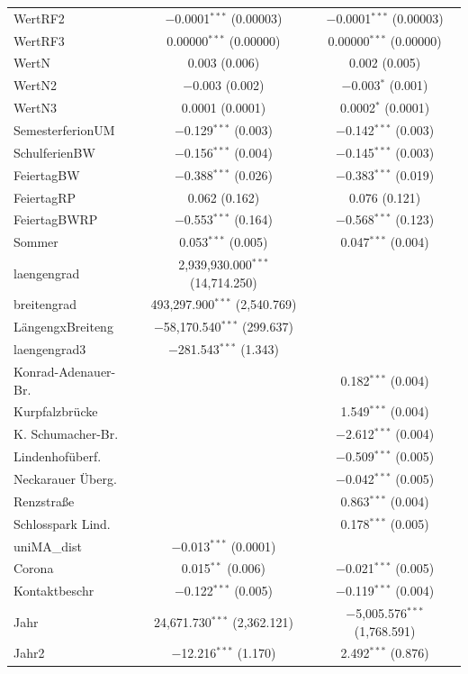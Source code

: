 \documentclass[a4paper,12pt]{thesis}
\begin{document}
\begin{longtable}{@{\extracolsep{-5pt}}lcc}
		WertRF2 & $-$0.0001$^{***}$ (0.00003) & $-$0.0001$^{***}$ (0.00003) \\ 
		WertRF3 & 0.00000$^{***}$ (0.00000) & 0.00000$^{***}$ (0.00000) \\ 
		WertN & 0.003 (0.006) & 0.002 (0.005) \\ 
		WertN2 & $-$0.003 (0.002) & $-$0.003$^{*}$ (0.001) \\ 
		WertN3 & 0.0001 (0.0001) & 0.0002$^{*}$ (0.0001) \\ 
		SemesterferionUM & $-$0.129$^{***}$ (0.003) & $-$0.142$^{***}$ (0.003) \\ 
		SchulferienBW & $-$0.156$^{***}$ (0.004) & $-$0.145$^{***}$ (0.003) \\ 
		FeiertagBW & $-$0.388$^{***}$ (0.026) & $-$0.383$^{***}$ (0.019) \\ 
		FeiertagRP & 0.062 (0.162) & 0.076 (0.121) \\ 
		FeiertagBWRP & $-$0.553$^{***}$ (0.164) & $-$0.568$^{***}$ (0.123) \\ 
		Sommer & 0.053$^{***}$ (0.005) & 0.047$^{***}$ (0.004) \\ 
		laengengrad & 2,939,930.000$^{***}$ (14,714.250) &  \\ 
		breitengrad & 493,297.900$^{***}$ (2,540.769) &  \\ 
		LängengxBreiteng & $-$58,170.540$^{***}$ (299.637) &  \\ 
		laengengrad3 & $-$281.543$^{***}$ (1.343) &  \\ 
		Konrad-Adenauer-Br. &  & 0.182$^{***}$ (0.004) \\ 
		Kurpfalzbrücke &  & 1.549$^{***}$ (0.004) \\ 
		K. Schumacher-Br. &  & $-$2.612$^{***}$ (0.004) \\ 
		Lindenhofüberf. &  & $-$0.509$^{***}$ (0.005) \\ 
		Neckarauer Überg. &  & $-$0.042$^{***}$ (0.005) \\ 
		Renzstraße &  & 0.863$^{***}$ (0.004) \\ 
		Schlosspark Lind. &  & 0.178$^{***}$ (0.005) \\ 
		uniMA\_dist & $-$0.013$^{***}$ (0.0001) &  \\ 
		Corona & 0.015$^{**}$ (0.006) & $-$0.021$^{***}$ (0.005) \\ 
		Kontaktbeschr & $-$0.122$^{***}$ (0.005) & $-$0.119$^{***}$ (0.004) \\ 
		Jahr & 24,671.730$^{***}$ (2,362.121) & $-$5,005.576$^{***}$ (1,768.591) \\ 
		Jahr2 & $-$12.216$^{***}$ (1.170) & 2.492$^{***}$ (0.876) \\ 

\end{longtable}
\end{document}
